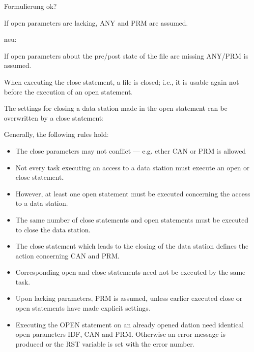 \begin{discuss}
Formulierung ok?

If open parameters are lacking, ANY and PRM are assumed.

neu:

If open parameters about the pre/post state of the file  are missing ANY/PRM 
is assumed.
\end{discuss}
When executing the close statement, a file is closed; i.e., it is
usable again not before the execution of an open statement.



The settings for closing a data station made in the open statement can
be overwritten by a close statement:



Generally, the following rules hold:
\begin{itemize}
\item The close parameters may not conflict --- e.g. ether CAN or PRM is allowed
\item Not every task executing an access to a data station must execute
an open or close statement.
\item However, at least one open statement must be executed concerning
the access to a data station.
\item The same number of close statements and open statements must
be executed to close the data station.
\item The close statement which leads to the closing of the data station
defines the action concerning CAN and PRM.
\item Corresponding open and close statements need not be executed by
the same task.
\item Upon lacking parameters, PRM is assumed, unless earlier
executed close or open statements have made explicit settings.
\item
Executing the OPEN statement on an already opened dation need identical 
open parameters IDF, CAN and PRM. Otherwise an error message is produced
or the RST variable is set with the error number.

\end{itemize}

